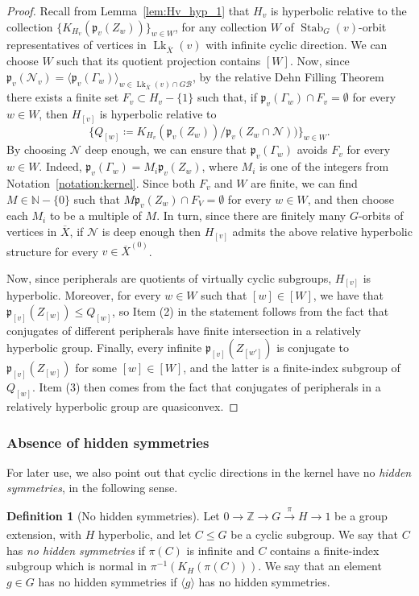 \documentclass[svgnames]{amsart}
\theoremstyle{plain}
\theoremstyle{definition}
\newtheorem{defn}[thm]{Definition}
\newcommand{\Z}{\mathbb{Z}}
\newcommand{\ov}[1]{\overline{#1}}
\newcommand{\link}{\operatorname{Lk}}
\newcommand{\Stab}[2]{\operatorname{Stab}_{#1}(#2)}
\newcommand{\N}{\mathcal{N}}
\newcommand{\B}{\mathcal{B}}
\newcommand{\p}{\mathfrak{p}}
\begin{document}
\begin{proof}
    Recall from Lemma~\ref{lem:Hv_hyp_1} that $H_v$ is hyperbolic relative to the collection $\{K_{H_v}(\p_v(Z_w))\}_{w\in W}$, for any collection $W$ of $\Stab{G}{v}$-orbit representatives of vertices in $\link_{\ov X}(v)$ with infinite cyclic direction. We can choose $W$ such that its quotient projection contains $[W]$. Now, since $\p_v(\N_v)=\langle \p_v(\Gamma_w)\rangle_{w\in\link_{\ov X}(v)\cap G\B}$, by the relative Dehn Filling Theorem \cite[Theorem 1.1]{Osin_Dehn_Fill} there exists a finite set $F_v\subset H_v-\{1\}$ such that, if $\p_v(\Gamma_w)\cap F_v=\emptyset$ for every $w\in W$, then $H_{[v]}$ is hyperbolic relative to 
    $$\{Q_{[w]}\coloneq K_{H_v}(\p_v(Z_w))/\p_v(Z_w\cap \N))\}_{w\in W}.$$
    By choosing $\N$ deep enough, we can ensure that $\p_v(\Gamma_w)$ avoids $F_v$ for every $w\in W$. Indeed, $\p_v(\Gamma_w)=M_i\p_v(Z_w)$, where $M_i$ is one of the integers from Notation~\ref{notation:kernel}. Since both $F_v$ and $W$ are finite, we can find $M\in \mathbb{N}-\{0\}$ such that $M\p_v(Z_w)\cap F_V=\emptyset$ for every $w\in W$, and then choose each $M_i$ to be a multiple of $M$. In turn, since there are finitely many $G$-orbits of vertices in $\ov X$, if $\N$ is deep enough then $H_{[v]}$ admits the above relative hyperbolic structure for every $v\in \ov X^{(0)}$.
    
    Now, since peripherals are quotients of virtually cyclic subgroups, $H_{[v]}$ is hyperbolic. Moreover, for every $w\in W$ such that $[w]\in [W]$, we have that $\p_{[v]}(Z_{[w]})\le Q_{[w]}$, so Item (2) in the statement follows from the fact that conjugates of different peripherals have finite intersection in a relatively hyperbolic group. Finally, every infinite $\p_{[v]}(Z_{[w']})$ is conjugate to $\p_{[v]}(Z_{[w]})$ for some $[w]\in [W]$, and the latter is a finite-index subgroup of $Q_{[w]}$. Item (3) then comes from the fact that conjugates of peripherals in a relatively hyperbolic group are quasiconvex.
\end{proof}


\subsubsection{Absence of hidden symmetries}
For later use, we also point out that cyclic directions in the kernel have no \emph{hidden symmetries}, in the following sense.

\begin{defn}[No hidden symmetries]\label{defn:hiddensymm_general}
    Let $0\to \Z\to G\xrightarrow[]{\pi} H\to 1$ be a group extension, with $H$ hyperbolic, and let $C\le G$ be a cyclic subgroup. We say that $C$ has \emph{no hidden symmetries} if $\pi(C)$ is infinite and $C$ contains a finite-index subgroup which is normal in $\pi^{-1}(K_H(\pi(C)))$. We say that an element $g\in G$ has no hidden symmetries if $\langle g\rangle$ has no hidden symmetries.
\end{defn}
\end{document}

